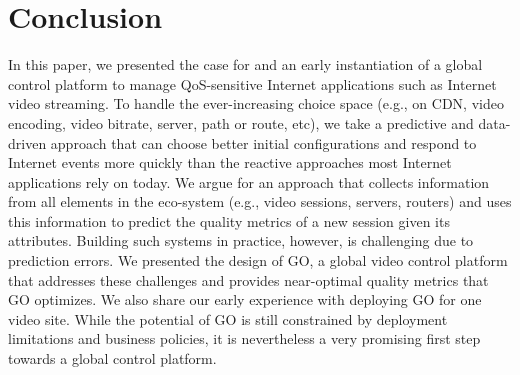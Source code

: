 \section{Conclusion}

In this paper, we presented the case for and an early instantiation of
a global control platform to manage QoS-sensitive Internet
applications such as Internet video streaming. To handle the
ever-increasing choice space (e.g., on CDN, video encoding, video
bitrate, server, path or route, etc), we take a predictive and
data-driven approach that can choose better initial configurations and
respond to Internet events more quickly than the reactive approaches
most Internet applications rely on today. We argue for an approach
that collects information from all elements in the eco-system (e.g.,
video sessions, servers, routers) and uses this information to predict
the quality metrics of a new session given its attributes.  Building
such systems in practice, however, is challenging due to prediction
errors.  We presented the design of GO, a global video control
platform that addresses these challenges and provides near-optimal
quality metrics that GO optimizes.  We also share our early experience
with deploying GO for one video site.  While the potential of GO is
still constrained by deployment limitations and business policies, it
is nevertheless a very promising first step towards a global control
platform.

